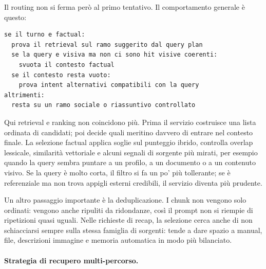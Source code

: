Il routing non si ferma però al primo tentativo. Il comportamento generale è questo:

\begin{lstlisting}[basicstyle=\ttfamily\small,breaklines=true]
se il turno e factual:
  prova il retrieval sul ramo suggerito dal query plan
  se la query e visiva ma non ci sono hit visive coerenti:
    svuota il contesto factual
  se il contesto resta vuoto:
    prova intent alternativi compatibili con la query
altrimenti:
  resta su un ramo sociale o riassuntivo controllato
\end{lstlisting}

Qui retrieval e ranking non coincidono più. Prima il servizio costruisce una lista ordinata di candidati; poi decide quali meritino davvero di entrare nel contesto finale. La selezione factual applica soglie sul punteggio ibrido, controlla overlap lessicale, similarità vettoriale e alcuni segnali di sorgente più mirati, per esempio quando la query sembra puntare a un profilo, a un documento o a un contenuto visivo. Se la query è molto corta, il filtro si fa un po' più tollerante; se è referenziale ma non trova appigli esterni credibili, il servizio diventa più prudente.

Un altro passaggio importante è la deduplicazione. I chunk non vengono solo ordinati: vengono anche ripuliti da ridondanze, così il prompt non si riempie di ripetizioni quasi uguali. Nelle richieste di recap, la selezione cerca anche di non schiacciarsi sempre sulla stessa famiglia di sorgenti: tende a dare spazio a manual, file, descrizioni immagine e memoria automatica in modo più bilanciato.

\paragraph{Strategia di recupero multi-percorso.}

